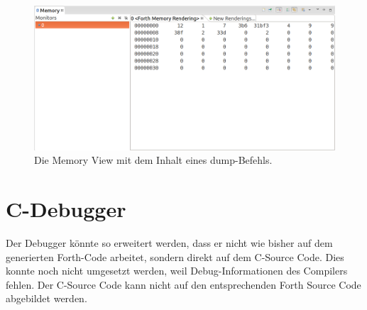 \begin{figure}[H]
	\centering
		\includegraphics[scale=0.35]{debugger/dump.png}
		\caption{Die Memory View mit dem Inhalt eines dump-Befehls.}
		\label{fig:dump}
\end{figure}


\section{C-Debugger}

Der Debugger könnte so erweitert werden, dass er nicht wie bisher auf dem generierten Forth-Code arbeitet, sondern direkt auf dem C-Source Code. Dies konnte noch nicht umgesetzt werden, weil Debug-Informationen des Compilers fehlen. Der C-Source Code kann nicht auf den entsprechenden Forth Source Code abgebildet werden.